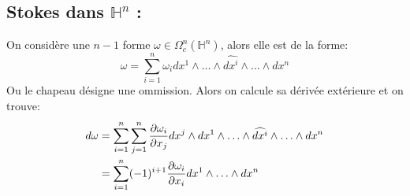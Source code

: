    \subsection*{Stokes dans \( \mathbb{H}^n \) {:}}
   On considère une \( n-1\) forme \(\omega \in \Omega_c^n(\mathbb{H}^n)\), alors elle est de la forme:
   \[ 
      \omega = \sum_{i = 1}^n \omega_i dx^1 \wedge \ldots \wedge \widehat{dx^i} \wedge \ldots \wedge dx^n
   \]
   Ou le chapeau désigne une ommission. Alors on calcule sa dérivée extérieure et on trouve:
   \begin{align*}
      d\omega &= \sum_{i = 1}^n \sum_{j = 1}^n \frac{\partial \omega_i}{\partial x_j} dx^j \wedge dx^1 \wedge \ldots \wedge \widehat{dx^i} \wedge \ldots \wedge dx^n\\
      &=  \sum_{i = 1}^n (-1)^{i+1} \frac{\partial \omega_i}{\partial x_i} dx^1 \wedge \ldots \wedge dx^n
   \end{align*}
